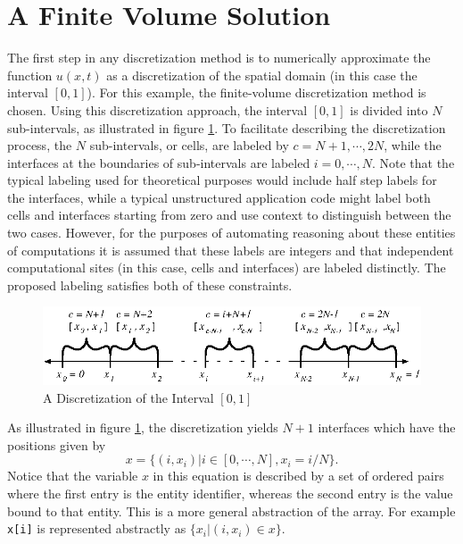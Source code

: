 \documentclass[10pt,epsf,letterpaper,twoside]{book}
\begin{document}
\section{A Finite Volume Solution}

The first step in any discretization method is to numerically
approximate the function $u(x,t)$ as a discretization of the
spatial domain (in this case the interval $[0,1]$).  For this example,
the finite-volume discretization method is chosen.  Using
this discretization approach, the interval $[0,1]$ is divided into $N$
sub-intervals, as illustrated in figure \ref{fig3:oned}.  To
facilitate describing the discretization process, the $N$
sub-intervals, or cells, are labeled by $c = N+1, \cdots, 2N$, while
the interfaces at the boundaries of sub-intervals are labeled $i = 0,
\cdots, N$.  Note that the typical labeling used for theoretical
purposes would include half step labels for the interfaces, while a
typical unstructured application code might label both cells and
interfaces starting from zero and use context to distinguish between
the two cases.  However, for the purposes of automating reasoning
about these entities of computations it is assumed that these labels
are integers and that independent computational sites (in this case,
cells and interfaces) are labeled distinctly.  The proposed labeling
satisfies both of these constraints.

\begin{figure}[htbp]
 \centerline{
\includegraphics[width=5.50in]{figures/one-d.eps}}
 \caption{A Discretization of the Interval $[0,1]$}
 \label{fig3:oned}
\end{figure}

As illustrated in figure \ref{fig3:oned}, the discretization yields
$N+1$ interfaces which have the positions given by
\begin{equation}
x = \lbrace (i,x_i) | i \in [0, \cdots, N], x_i = i/N \rbrace.
\label{eq3:interfacex}
\end{equation}
Notice that the variable $x$ in this equation is described by a set of
ordered pairs where the first entry is the entity identifier, whereas
the second entry is the value bound to that entity.  This is a more
general abstraction of the array.  For example {\tt x[i]} is
represented abstractly as $\lbrace x_i | (i,x_i) \in x \rbrace$.
\end{document}
